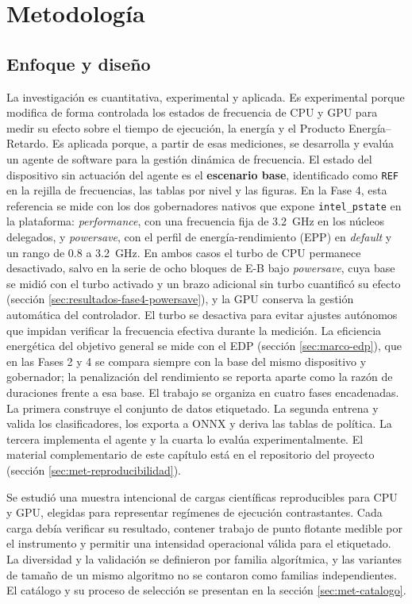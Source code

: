 \chapter{Metodología}
\label{cap:metodologia}

\section{Enfoque y diseño}
\label{sec:met-enfoque}

La investigación es cuantitativa, experimental y aplicada. Es experimental porque modifica de forma controlada los estados de frecuencia de CPU y GPU para medir su efecto sobre el tiempo de ejecución, la energía y el Producto Energía--Retardo. Es aplicada porque, a partir de esas mediciones, se desarrolla y evalúa un agente de software para la gestión dinámica de frecuencia. El estado del dispositivo sin actuación del agente es el \textbf{escenario base}, identificado como \texttt{REF} en la rejilla de frecuencias, las tablas por nivel y las figuras. En la Fase 4, esta referencia se mide con los dos gobernadores nativos que expone \texttt{intel\_pstate} \cite{LinuxIntelPstate2026} en la plataforma: \textit{performance}, con una frecuencia fija de 3.2~GHz en los núcleos delegados, y \textit{powersave}, con el perfil de energía-rendimiento (EPP) en \textit{default} y un rango de 0.8 a 3.2~GHz. En ambos casos el turbo de CPU permanece desactivado, salvo en la serie de ocho bloques de E-B bajo \textit{powersave}, cuya base se midió con el turbo activado y un brazo adicional sin turbo cuantificó su efecto (sección \ref{sec:resultados-fase4-powersave}), y la GPU conserva la gestión automática del controlador. El turbo se desactiva para evitar ajustes autónomos que impidan verificar la frecuencia efectiva durante la medición. La eficiencia energética del objetivo general se mide con el EDP (sección \ref{sec:marco-edp}), que en las Fases 2 y 4 se compara siempre con la base del mismo dispositivo y gobernador; la penalización del rendimiento se reporta aparte como la razón de duraciones frente a esa base. El trabajo se organiza en cuatro fases encadenadas. La primera construye el conjunto de datos etiquetado. La segunda entrena y valida los clasificadores, los exporta a ONNX y deriva las tablas de política. La tercera implementa el agente y la cuarta lo evalúa experimentalmente. El material complementario de este capítulo está en el repositorio del proyecto (sección \ref{sec:met-reproducibilidad}).


Se estudió una muestra intencional de cargas científicas reproducibles para CPU y GPU, elegidas para representar regímenes de ejecución contrastantes. Cada carga debía verificar su resultado, contener trabajo de punto flotante medible por el instrumento y permitir una intensidad operacional válida para el etiquetado. La diversidad y la validación se definieron por familia algorítmica, y las variantes de tamaño de un mismo algoritmo no se contaron como familias independientes. El catálogo y su proceso de selección se presentan en la sección \ref{sec:met-catalogo}.


